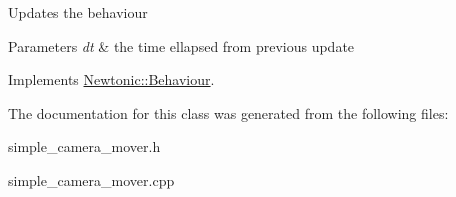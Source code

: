 Updates the behaviour 
\begin{DoxyParams}{Parameters}
{\em dt} & the time ellapsed from previous update \\
\hline
\end{DoxyParams}


Implements \mbox{\hyperlink{classNewtonic_1_1Behaviour_aaed714f38c7b270381e81958b280d248}{Newtonic\+::\+Behaviour}}.



The documentation for this class was generated from the following files\+:\begin{DoxyCompactItemize}
\item 
simple\+\_\+camera\+\_\+mover.\+h\item 
simple\+\_\+camera\+\_\+mover.\+cpp\end{DoxyCompactItemize}
